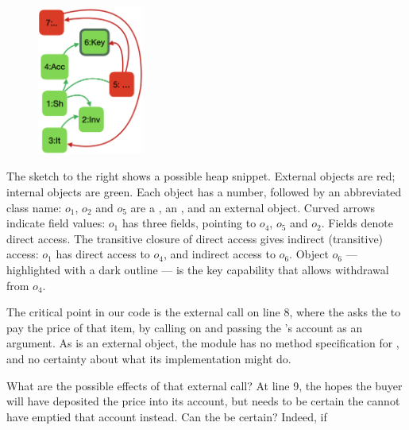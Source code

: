 { 



\begin{figure}%
\includegraphics[width=35mm]{diagrams/ShopAtrimmed.png}
\end{figure}



\noindent The sketch to the right shows a possible heap snippet.
External objects are red; internal objects are green.
%
Each object has a number,
followed by an abbreviated class name: $o_1$, $o_2$ and $o_5$ are a , an , and an external object. 
Curved arrows
indicate field values: $o_1$ has three fields, pointing to 
$o_4$, $o_5$ and $o_2$.
%
Fields denote direct access. The transitive closure of direct access
gives indirect (transitive) access: $o_1$ has direct access to $o_4$, and indirect access to $o_6$.
%
Object $o_6$ ---
highlighted with a dark outline
---
is the key capability that allows withdrawal from $o_4$.

The critical point in our code is the external call on line 8,   where the  asks the  to pay the price of that item,
by calling   on  and passing the 's account as an argument.
As  is an external object, the module \Mshop has no method specification for , and no 
certainty about what its implementation %
might do. 


What are the possible effects of that external call?
At line 9, the  hopes
the buyer will have deposited the price into its account, 
but needs to be certain the  cannot
have emptied that account instead. 
%
Can the   be certain? Indeed, if

}
